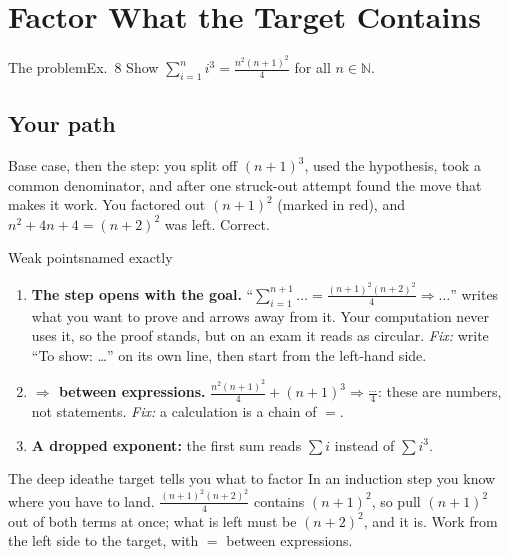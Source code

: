 \documentclass{kaelearn}
\begin{document}
\section{Factor What the Target Contains}

\begin{panel}[unbreakable]{The problem}{Ex.\ 8}{}
Show $\displaystyle\sum_{i=1}^{n}i^3=\frac{n^2(n+1)^2}{4}$ for all $n\in\mathbb{N}$.
\end{panel}

\subsection{Your path}
Base case, then the step: you split off $(n+1)^3$, used the hypothesis, took a common denominator, and after one
struck-out attempt found the move that makes it work. You factored out $(n+1)^2$ (marked in red), and $n^2+4n+4=(n+2)^2$
was left. Correct.

\begin{panel}[unbreakable]{Weak points}{named exactly}{}
\begin{enumerate}
  \item \textbf{The step opens with the goal.} ``$\sum_{i=1}^{n+1}\dots=\frac{(n+1)^2(n+2)^2}{4}\Rightarrow\dots$''
        writes what you want to prove and arrows away from it. Your computation never uses it, so the proof stands,
        but on an exam it reads as circular. \emph{Fix:} write ``To show: \dots'' on its own line, then start from
        the left-hand side.
  \item \textbf{$\Rightarrow$ between expressions.} $\frac{n^2(n+1)^2}{4}+(n+1)^3\Rightarrow\frac{\dots}{4}$: these are
        numbers, not statements. \emph{Fix:} a calculation is a chain of $=$.
  \item \textbf{A dropped exponent:} the first sum reads $\sum i$ instead of $\sum i^3$.
\end{enumerate}
\end{panel}

\begin{panel}[unbreakable]{The deep idea}{the target tells you what to factor}{}
In an induction step you know where you have to land. $\frac{(n+1)^2(n+2)^2}{4}$ contains $(n+1)^2$, so pull
$(n+1)^2$ out of both terms at once; what is left must be $(n+2)^2$, and it is. Work from the left side to the target,
with $=$ between expressions.
\end{panel}
\end{document}
